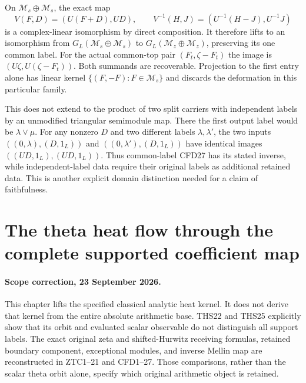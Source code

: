 \documentclass[11pt]{article}
\theoremstyle{definition}
\begin{document}
On $\mathcal M_s\oplus\mathcal M_s$, the exact map
\begin{equation}\tag{CFD27}
 V(F,D)=(U(F+D),UD),\qquad
 V^{-1}(H,J)=(U^{-1}(H-J),U^{-1}J)
\end{equation}
is a complex-linear isomorphism by direct composition. It therefore
lifts to an isomorphism from
$G_L(\mathcal M_s\oplus\mathcal M_s)$ to
$G_L(\mathcal M_z\oplus\mathcal M_z)$, preserving its one common
label. For the actual common-top pair
$(F_t,\zeta-F_t)$ the image is $(U\zeta,U(\zeta-F_t))$.
Both summands are recoverable. Projection to the first entry
alone has linear kernel $\{(F,-F):F\in\mathcal M_s\}$ and
discards the deformation in this particular family.

This does not extend to the product of two split carriers with
independent labels by an unmodified triangular semimodule map.
There the first output label would be $\lambda\vee\mu$. For
any nonzero $D$ and two different labels $\lambda,\lambda'$,
the two inputs $((0,\lambda),(D,1_L))$ and
$((0,\lambda'),(D,1_L))$ have identical images
$((UD,1_L),(UD,1_L))$. Thus common-label CFD27 has its stated
inverse, while independent-label data require their original
labels as additional retained data. This is another explicit
domain distinction needed for a claim of faithfulness.

\clearpage

\appendix

\section{The theta heat flow through the complete supported coefficient map}
\label{sec:theta-heat-full-support}

\paragraph{Scope correction, 23 September 2026.}
This chapter lifts the specified classical analytic heat kernel. It does
not derive that kernel from the entire absolute arithmetic base.
THS22 and THS25 explicitly show that its orbit and evaluated scalar
observable do not distinguish all support labels. The exact original
zeta and shifted-Hurwitz receiving formulas, retained boundary component,
exceptional modules, and inverse Mellin map are reconstructed in
ZTC1--21 and CFD1--27. Those comparisons, rather than the scalar
theta orbit alone, specify which original arithmetic object is retained.
\end{document}
